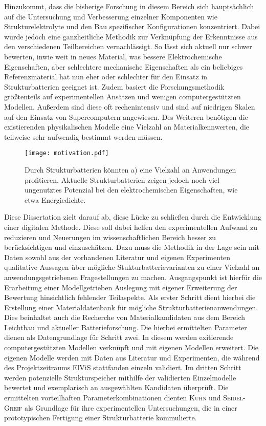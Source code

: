 Hinzukommt, dass die bisherige Forschung in diesem Bereich sich hauptsächlich auf die Untersuchung und Verbesserung einzelner Komponenten wie Strukturelektrolyte und den Bau spezifischer Konfigurationen konzentriert. Dabei wurde jedoch eine ganzheitliche Methodik zur Verknüpfung der Erkenntnisse aus den verschiedenen Teilbereichen vernachlässigt. So lässt sich aktuell nur schwer bewerten, inwie weit in neues Material, was bessere Elektrochemische Eigenschaften, aber schlechtere mechanische Eigenschaften als ein beliebiges Referenzmaterial hat nun eher oder schlechter für den Einsatz in Strukturbatterien geeignet ist. Zudem basiert die Forschungsmethodik größtenteils auf experimentellen Ansätzen und wenigen computergestützten Modellen. Außerdem sind diese oft rechenintensiv und sind auf niedrigen Skalen auf den Einsatz von Supercomputern angewiesen. Des Weiteren benötigen die existierenden physikalischen Modelle eine Vielzahl an Materialkennwerten, die teilweise sehr aufwendig bestimmt werden müssen.

\begin{figure}[h]
        \center
	\texttt{[image: motivation.pdf]}
		\caption{\label{fig:motivation} Durch Strukturbatterien könnten a) eine Vielzahl an Anwendungen profitieren. Aktuelle Strukturbatterien zeigen jedoch noch viel ungenutztes Potenzial bei den elektrochemischen Eigenschaften, wie etwa Energiedichte.}
\end{figure}

Diese Dissertation zielt darauf ab, diese Lücke zu schließen durch die Entwicklung einer digitalen Methode. Diese soll dabei helfen den experimentellen Aufwand zu reduzieren und Neuerungen im wissenschaftlichen Bereich besser zu berücksichtigen und einzuschätzen. Dazu muss die Methodik in der Lage sein mit Daten sowohl aus der vorhandenen Literatur und eigenen Experimenten qualitative Aussagen über mögliche Stukturbatterievarianten zu einer Vielzahl an anwendungsgetriebenen Fragestellungen zu machen. 
Ausgangspunkt ist hierfür die Erarbeitung einer Modellgetrieben Auslegung mit eigener Erweiterung der Bewertung hinsichtlich fehlender Teilaspekte. Als erster Schritt dient hierbei die Erstellung einer Materialdatenbank für mögliche Strukturbatterienanwendungen. Dies beinhaltet auch die Recherche von Materialkandidaten aus dem Bereich Leichtbau und aktueller Batterieforschung. Die hierbei ermittelten Parameter dienen als Datengrundlage für Schritt zwei. In diesem werden exitierende computergestützten Modellen verknüpft und mit eigenen Modellen erweitert. Die eigenen Modelle werden mit Daten aus Literatur und Experimenten, die während des Projektzeitraums ElViS stattfanden einzeln validiert. Im dritten Schritt werden potenzielle Strukturspeicher mithilfe der validierten Einzelmodelle bewertet und exemplarisch an ausgewählten Kandidaten überprüft. Die ermittelten vorteilhaften Parameterkombinationen dienten \textsc{Kühn} und \textsc{Seidel-Greif} als Grundlage für ihre experimentellen Untersuchungen, die in einer prototypischen Fertigung einer Strukturbatterie kommulierte.

